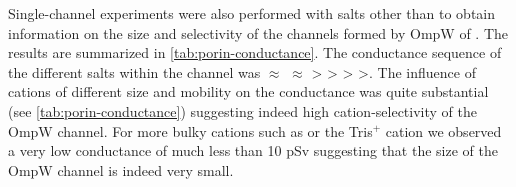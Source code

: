 Single-channel experiments were also performed with salts other than  to obtain information on the size and selectivity of the channels formed by OmpW of \caulobacter. The results are summarized in \cref{tab:porin-conductance}. The conductance sequence of the different salts within the channel was  $\approx$  $\approx$  \textgreater {} \textgreater {} \textgreater {} \textgreater {}. The influence of cations of different size and mobility on the conductance was quite substantial (see \cref{tab:porin-conductance}) suggesting indeed high cation-selectivity of the OmpW channel. For more bulky cations such as  or the Tris$^+$ cation we observed a very low conductance of much less than 10 \si{\pico\sievert} suggesting that the size of the OmpW channel is indeed very small. 

